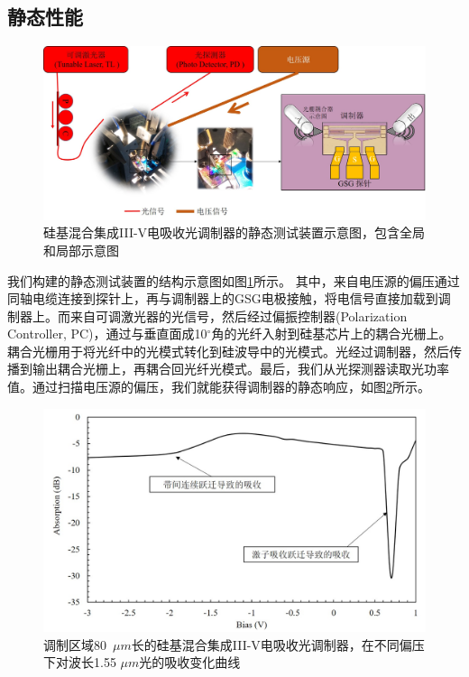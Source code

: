 \subsection{静态性能}
\begin{figure}[htb]
	\centering
	\includegraphics[width=15cm]{./Pictures/chapt4_static_measure_setup.jpg}
	\caption{硅基混合集成III-V电吸收光调制器的静态测试装置示意图，包含全局和局部示意图}
	\label{chapt4_static_measure_setup}
\end{figure}
我们构建的静态测试装置的结构示意图如图\ref{chapt4_static_measure_setup}所示。 其中，来自电压源的偏压通过同轴电缆连接到探针上，再与调制器上的GSG电极接触，将电信号直接加载到调制器上。而来自可调激光器的光信号，然后经过偏振控制器(Polarization Controller, PC)，通过与垂直面成10$^\circ$角的光纤入射到硅基芯片上的耦合光栅上。耦合光栅用于将光纤中的光模式转化到硅波导中的光模式。光经过调制器，然后传播到输出耦合光栅上，再耦合回光纤光模式。最后，我们从光探测器读取光功率值。通过扫描电压源的偏压，我们就能获得调制器的静态响应，如图\ref{chapt4_static_measure_1550}所示。
\begin{figure}[htb]
	\centering
	\includegraphics[width=14cm]{./Pictures/chapt4_static_measure_1550.jpg}
	\caption{调制区域80~$\mu m$长的硅基混合集成III-V电吸收光调制器，在不同偏压下对波长1.55 $\mu m$光的吸收变化曲线}
	\label{chapt4_static_measure_1550}
\end{figure}

